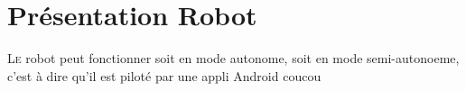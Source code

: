 \newpage

\section{Présentation Robot}
\lettrine[lines=1]{L}e robot peut fonctionner soit en mode autonome, soit en mode semi-autonoeme, c'est à dire qu'il est piloté par une appli Android
coucou



 